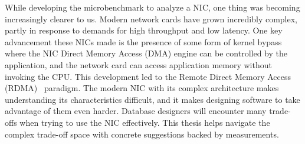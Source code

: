 While developing the microbenchmark to analyze a NIC, one thing was becoming increasingly clearer to us.
Modern network cards have grown incredibly complex, partly in response to
demands for high throughput and low latency. One key advancement these NICs made 
is the presence of some form of kernel bypass where the NIC Direct Memory Access (DMA) engine can be 
controlled by the application, and the network card can \linebreak access application memory without invoking the CPU. 
This development led to the \linebreak Remote Direct Memory Access (RDMA)~\cite{rdmapatent} paradigm. 
The modern NIC with its \linebreak complex architecture makes understanding its characteristics difficult, 
and it makes \linebreak designing software to take advantage of them even harder. 
Database designers will \linebreak encounter many trade-offs when trying to use the NIC effectively. 
This thesis helps \linebreak navigate the complex trade-off space with concrete suggestions backed by measurements.

